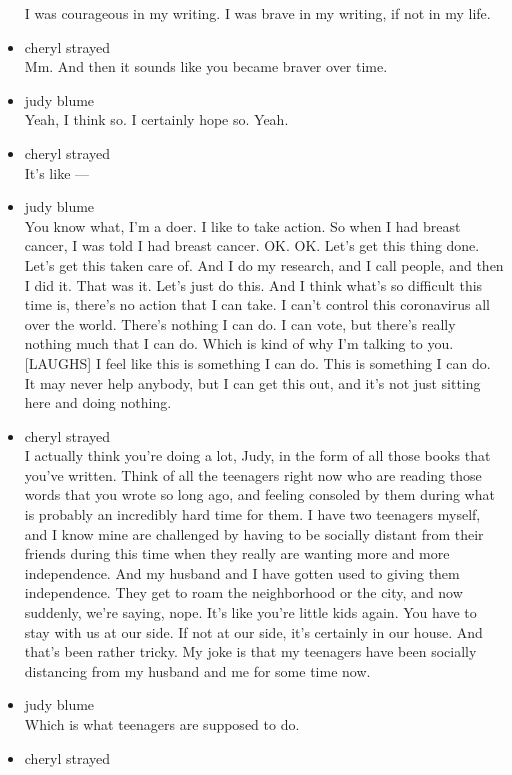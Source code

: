 \begin{itemize}
  I was courageous in my writing. I was brave in my writing, if not in
  my life.
\item
  cheryl strayed\\
  Mm. And then it sounds like you became braver over time.
\item
  judy blume\\
  Yeah, I think so. I certainly hope so. Yeah.
\item
  cheryl strayed\\
  It's like ---
\item
  judy blume\\
  You know what, I'm a doer. I like to take action. So when I had breast
  cancer, I was told I had breast cancer. OK. OK. Let's get this thing
  done. Let's get this taken care of. And I do my research, and I call
  people, and then I did it. That was it. Let's just do this. And I
  think what's so difficult this time is, there's no action that I can
  take. I can't control this coronavirus all over the world. There's
  nothing I can do. I can vote, but there's really nothing much that I
  can do. Which is kind of why I'm talking to you. {[}LAUGHS{]} I feel
  like this is something I can do. This is something I can do. It may
  never help anybody, but I can get this out, and it's not just sitting
  here and doing nothing.
\item
  cheryl strayed\\
  I actually think you're doing a lot, Judy, in the form of all those
  books that you've written. Think of all the teenagers right now who
  are reading those words that you wrote so long ago, and feeling
  consoled by them during what is probably an incredibly hard time for
  them. I have two teenagers myself, and I know mine are challenged by
  having to be socially distant from their friends during this time when
  they really are wanting more and more independence. And my husband and
  I have gotten used to giving them independence. They get to roam the
  neighborhood or the city, and now suddenly, we're saying, nope. It's
  like you're little kids again. You have to stay with us at our side.
  If not at our side, it's certainly in our house. And that's been
  rather tricky. My joke is that my teenagers have been socially
  distancing from my husband and me for some time now.
\item
  judy blume\\
  Which is what teenagers are supposed to do.
\item
  cheryl strayed\\

\end{itemize}

